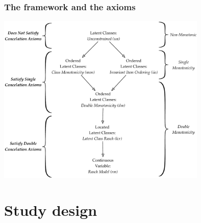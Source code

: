 \documentclass[10pt,serif,professionalfont]{beamer}
\begin{document}
\begin{frame}

    \frametitle{The framework and the axioms}

        \centering \includegraphics[width=0.75\textwidth]{./figs/TA_ACM.pdf} \\

\end{frame}


\section{Study design}
\end{document}
